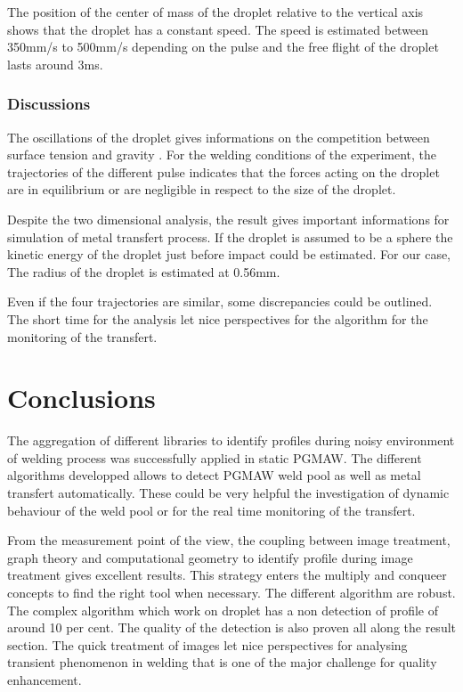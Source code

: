 \documentclass[12pt]{iopart}
\begin{document}
The position of the center of mass of the droplet relative to the vertical axis shows that the 
droplet has a constant speed. The speed is estimated between 350mm/s to 500mm/s depending on the pulse
and the free flight of the droplet lasts around  3ms.



\subsubsection{Discussions}
\label{discussions}

The oscillations of the droplet gives informations on the competition between surface tension and gravity
\cite{White}.
For the welding conditions of the experiment, the trajectories of the different pulse indicates 
that the forces acting on the droplet are in equilibrium
or are negligible in respect to the size of the droplet.

Despite the two dimensional analysis, the result gives important informations for 
simulation of metal transfert process. If  the droplet is assumed to be a sphere
 the kinetic energy of the droplet just before impact could be estimated. For our case,
The radius of the droplet is estimated at 0.56mm. %

Even if the four trajectories are similar, some discrepancies could be outlined. The short time 
for the analysis let nice perspectives for the algorithm for the monitoring of the transfert.



\section{ Conclusions}
\label{conclusions}

The aggregation of different libraries to identify profiles during noisy environment of welding process
was successfully applied in static PGMAW. The different algorithms developped allows to detect PGMAW weld pool
as well as metal transfert automatically. These could be very helpful the investigation of dynamic behaviour
of the weld pool or for the real time monitoring of the transfert. 

From the measurement point of the view, the
coupling between image treatment, graph theory and computational
 geometry to identify profile during image treatment
gives excellent results. 
This strategy enters the multiply and conqueer concepts
to find the right tool when necessary.
 The different algorithm are robust. The complex algorithm which work on droplet
has a non detection of profile of around 10 per cent.
The quality of the detection is also proven all along the result section. 
The quick treatment of images let nice perspectives for analysing transient phenomenon in welding 
 that is one of the major challenge for quality enhancement.
\end{document}
